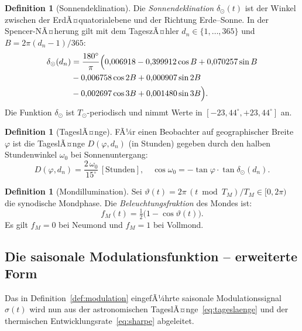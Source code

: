 ﻿\documentclass[12pt, a4paper]{article}
\theoremstyle{definition}
\newtheorem{definition}[theorem]{Definition}
\begin{document}
\begin{definition}[Sonnendeklination]\label{def:deklination}
Die \emph{Sonnendeklination} $\delta_{\odot}(t)$ ist der Winkel zwischen der
ErdÃ¤quatorialebene und der Richtung Erde--Sonne. In der Spencer-NÃ¤herung gilt
mit dem TageszÃ¤hler $d_n \in \{1,\ldots,365\}$ und $B = 2\pi(d_n - 1)/365$:
\begin{align*}\label{eq:deklination}
  \delta_{\odot}(d_n) &= \frac{180^\circ}{\pi}\Bigl( 
    0{,}006918 - 0{,}399912\cos B + 0{,}070257\sin B \\
    &- 0{,}006758\cos 2B + 0{,}000907\sin 2B \\
    &- 0{,}002697\cos 3B + 0{,}001480\sin 3B
  \Bigr).
\end{align*}
Die Funktion $\delta_{\odot}$ ist $T_{\odot}$-periodisch und nimmt Werte in
$[-23{,}44^\circ, +23{,}44^\circ]$ an.
\end{definition}

\begin{definition}[TageslÃ¤nge]\label{def:tageslaenge}
FÃ¼r einen Beobachter auf geographischer Breite $\varphi$ ist die TageslÃ¤nge
$D(\varphi, d_n)$ (in Stunden) gegeben durch den halben Stundenwinkel
$\omega_0$ bei Sonnenuntergang:
\begin{equation}\label{eq:tageslaenge}
  D(\varphi, d_n) = \frac{2\,\omega_0}{15^\circ}\,[\text{Stunden}],\quad
  \cos\omega_0 = -\tan\varphi\cdot\tan\delta_{\odot}(d_n).
\end{equation}
\end{definition}

\begin{definition}[Mondillumination]\label{def:mondillumination}
Sei $\vartheta(t) = 2\pi\, (t \bmod T_M)/T_M \in [0, 2\pi)$ die synodische
Mondphase. Die \emph{Beleuchtungsfraktion} des Mondes ist:
\begin{equation}\label{eq:illumination}
  f_M(t) = \tfrac{1}{2}\bigl(1 - \cos\vartheta(t)\bigr).
\end{equation}
Es gilt $f_M = 0$ bei Neumond und $f_M = 1$ bei Vollmond.
\end{definition}

\subsection{Die saisonale Modulationsfunktion -- erweiterte Form}

Das in Definition~\ref{def:modulation} eingefÃ¼hrte saisonale Modulationssignal
$\sigma(t)$ wird nun aus der astronomischen TageslÃ¤nge~\eqref{eq:tageslaenge}
und der thermischen Entwicklungsrate~\eqref{eq:sharpe} abgeleitet.
\end{document}

